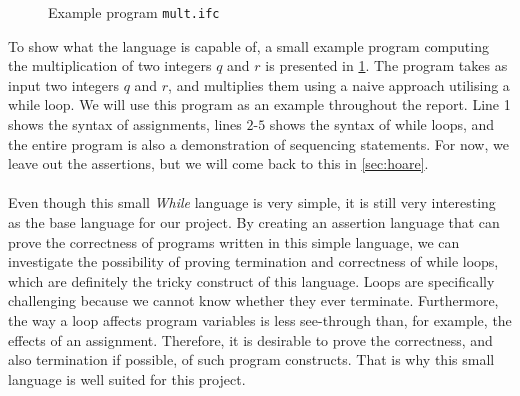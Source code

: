 \begin{figure}[h]

\caption{Example program \texttt{mult.ifc}}
\label{figure:basicmult}
\end{figure}

To show what the language is capable of, a small example program computing the multiplication of two integers $q$ and $r$ is presented in \cref{figure:basicmult}. 
The program takes as input two integers $q$ and $r$, and multiplies them using a naive approach utilising a while loop.
We will use this program as an example throughout the report.
Line 1 shows the syntax of assignments, lines $2$-$5$ shows the syntax of while loops, and the entire program is also a demonstration of sequencing statements.
For now, we leave out the assertions, but we will come back to this in \cref{sec:hoare}.
\\~\\
Even though this small \textit{While} language is very simple, it is still very interesting as the base language for our project.
By creating an assertion language that can prove the correctness of programs written in this simple language, we can investigate the possibility of proving termination and correctness of while loops, which are definitely the tricky construct of this language.
Loops are specifically challenging because we cannot know whether they ever terminate. Furthermore, the way a loop affects program variables is less see-through than, for example, the effects of an assignment.
Therefore, it is desirable to prove the correctness, and also termination if possible, of such program constructs. That is why this small language is well suited for this project.

